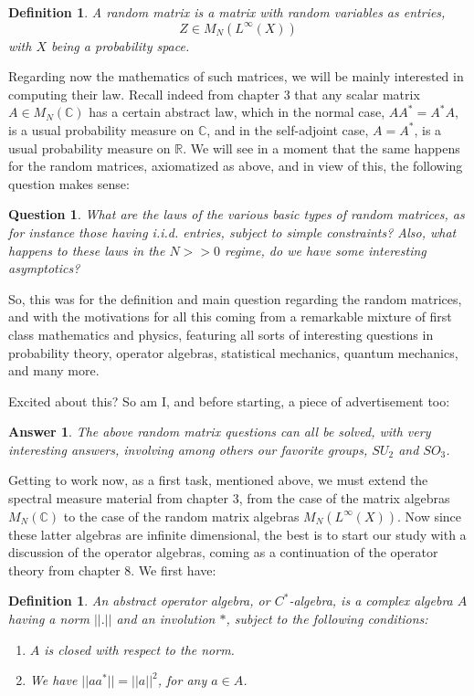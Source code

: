 \documentclass[12pt]{amsbook}
\newtheorem{answer}[theorem]{Answer}
\newtheorem{definition}[theorem]{Definition}
\newtheorem{question}[theorem]{Question}
\begin{document}
\begin{definition}
A random matrix is a matrix with random variables as entries,
$$Z\in M_N(L^\infty(X))$$
with $X$ being a probability space.
\end{definition}

Regarding now the mathematics of such matrices, we will be mainly interested in computing their law. Recall indeed from chapter 3 that any scalar matrix $A\in M_N(\mathbb C)$ has a certain abstract law, which in the normal case, $AA^*=A^*A$, is a usual probability measure on $\mathbb C$, and in the self-adjoint case, $A=A^*$, is a usual probability measure on $\mathbb R$. We will see in a moment that the same happens for the random matrices, axiomatized as above, and in view of this, the following question makes sense:

\begin{question}
What are the laws of the various basic types of random matrices, as for instance those having i.i.d. entries, subject to simple constraints? Also, what happens to these laws in the $N>>0$ regime, do we have some interesting asymptotics?
\end{question}

So, this was for the definition and main question regarding the random matrices, and with the motivations for all this coming from a remarkable mixture of first class mathematics and physics, featuring all sorts of interesting questions in probability theory, operator algebras, statistical mechanics, quantum mechanics, and many more.

\bigskip

Excited about this? So am I, and before starting, a piece of advertisement too:

\begin{answer}
The above random matrix questions can all be solved, with very interesting answers, involving among others our favorite groups, $SU_2$ and $SO_3$.
\end{answer}

Getting to work now, as a first task, mentioned above, we must extend the spectral measure material from chapter 3, from the case of the matrix algebras $M_N(\mathbb C)$ to the case of the random matrix algebras $M_N(L^\infty(X))$. Now since these latter algebras are infinite dimensional, the best is to start our study with a discussion of the operator algebras, coming as a continuation of the operator theory from chapter 8. We first have:

\begin{definition}
An abstract operator algebra, or $C^*$-algebra, is a complex algebra $A$ having a norm $||.||$ and an involution $*$, subject to the following conditions:
\begin{enumerate}
\item $A$ is closed with respect to the norm.

\item We have $||aa^*||=||a||^2$, for any $a\in A$.
\end{enumerate}
\end{definition}
\end{document}
